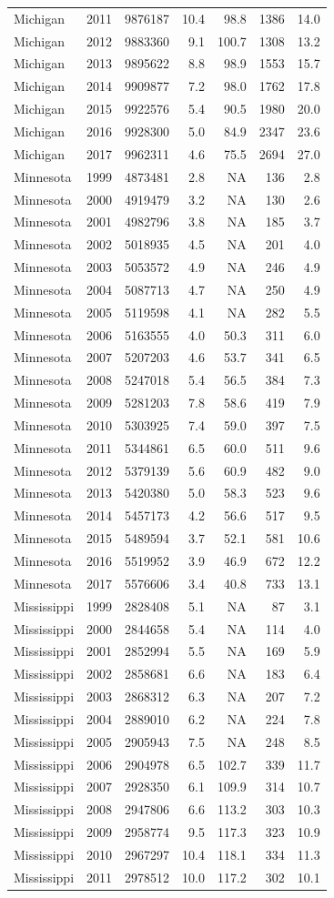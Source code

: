 \documentclass[
]{article}
\begin{document}
\begin{longtable}[]{@{}lrrrrrr@{}}
Michigan & 2011 & 9876187 & 10.4 & 98.8 & 1386 & 14.0\tabularnewline
Michigan & 2012 & 9883360 & 9.1 & 100.7 & 1308 & 13.2\tabularnewline
Michigan & 2013 & 9895622 & 8.8 & 98.9 & 1553 & 15.7\tabularnewline
Michigan & 2014 & 9909877 & 7.2 & 98.0 & 1762 & 17.8\tabularnewline
Michigan & 2015 & 9922576 & 5.4 & 90.5 & 1980 & 20.0\tabularnewline
Michigan & 2016 & 9928300 & 5.0 & 84.9 & 2347 & 23.6\tabularnewline
Michigan & 2017 & 9962311 & 4.6 & 75.5 & 2694 & 27.0\tabularnewline
Minnesota & 1999 & 4873481 & 2.8 & NA & 136 & 2.8\tabularnewline
Minnesota & 2000 & 4919479 & 3.2 & NA & 130 & 2.6\tabularnewline
Minnesota & 2001 & 4982796 & 3.8 & NA & 185 & 3.7\tabularnewline
Minnesota & 2002 & 5018935 & 4.5 & NA & 201 & 4.0\tabularnewline
Minnesota & 2003 & 5053572 & 4.9 & NA & 246 & 4.9\tabularnewline
Minnesota & 2004 & 5087713 & 4.7 & NA & 250 & 4.9\tabularnewline
Minnesota & 2005 & 5119598 & 4.1 & NA & 282 & 5.5\tabularnewline
Minnesota & 2006 & 5163555 & 4.0 & 50.3 & 311 & 6.0\tabularnewline
Minnesota & 2007 & 5207203 & 4.6 & 53.7 & 341 & 6.5\tabularnewline
Minnesota & 2008 & 5247018 & 5.4 & 56.5 & 384 & 7.3\tabularnewline
Minnesota & 2009 & 5281203 & 7.8 & 58.6 & 419 & 7.9\tabularnewline
Minnesota & 2010 & 5303925 & 7.4 & 59.0 & 397 & 7.5\tabularnewline
Minnesota & 2011 & 5344861 & 6.5 & 60.0 & 511 & 9.6\tabularnewline
Minnesota & 2012 & 5379139 & 5.6 & 60.9 & 482 & 9.0\tabularnewline
Minnesota & 2013 & 5420380 & 5.0 & 58.3 & 523 & 9.6\tabularnewline
Minnesota & 2014 & 5457173 & 4.2 & 56.6 & 517 & 9.5\tabularnewline
Minnesota & 2015 & 5489594 & 3.7 & 52.1 & 581 & 10.6\tabularnewline
Minnesota & 2016 & 5519952 & 3.9 & 46.9 & 672 & 12.2\tabularnewline
Minnesota & 2017 & 5576606 & 3.4 & 40.8 & 733 & 13.1\tabularnewline
Mississippi & 1999 & 2828408 & 5.1 & NA & 87 & 3.1\tabularnewline
Mississippi & 2000 & 2844658 & 5.4 & NA & 114 & 4.0\tabularnewline
Mississippi & 2001 & 2852994 & 5.5 & NA & 169 & 5.9\tabularnewline
Mississippi & 2002 & 2858681 & 6.6 & NA & 183 & 6.4\tabularnewline
Mississippi & 2003 & 2868312 & 6.3 & NA & 207 & 7.2\tabularnewline
Mississippi & 2004 & 2889010 & 6.2 & NA & 224 & 7.8\tabularnewline
Mississippi & 2005 & 2905943 & 7.5 & NA & 248 & 8.5\tabularnewline
Mississippi & 2006 & 2904978 & 6.5 & 102.7 & 339 & 11.7\tabularnewline
Mississippi & 2007 & 2928350 & 6.1 & 109.9 & 314 & 10.7\tabularnewline
Mississippi & 2008 & 2947806 & 6.6 & 113.2 & 303 & 10.3\tabularnewline
Mississippi & 2009 & 2958774 & 9.5 & 117.3 & 323 & 10.9\tabularnewline
Mississippi & 2010 & 2967297 & 10.4 & 118.1 & 334 & 11.3\tabularnewline
Mississippi & 2011 & 2978512 & 10.0 & 117.2 & 302 & 10.1\tabularnewline

\end{longtable}
\end{document}
